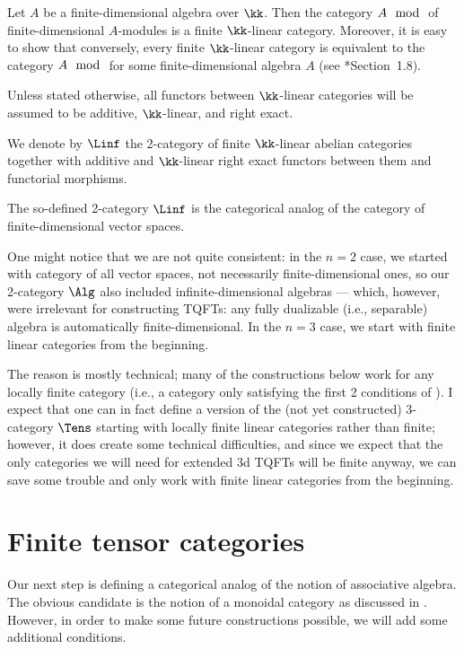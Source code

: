 \begin{example}\label{x:finite-cat-alg}
  Let $A$ be a finite-dimensional algebra over $\kk$. Then the category $A\mod$
  of finite-dimensional $A$-modules is a finite $\kk$-linear category. Moreover,
  it is easy to show that conversely, every finite $\kk$-linear category is
  equivalent to the category $A\mod$ for some finite-dimensional algebra $A$
  (see *{Section~1.8}).
\end{example}


Unless stated otherwise, all functors between $\kk$-linear categories will
be assumed to be additive, $\kk$-linear, and right exact.


\begin{definition}\label{d:linf}
  We denote by $\Linf$ the 2-category of finite $\kk$-linear abelian
  categories together with additive and $\kk$-linear right exact
  functors between them and functorial morphisms.
\end{definition}
The so-defined 2-category $\Linf$ is the categorical analog of the category of
finite-dimensional vector spaces.



\begin{remark}
  One might notice that we are not quite consistent: in the $n=2$ case, we started
  with category of all vector spaces, not necessarily finite-dimensional ones,
  so our 2-category $\Alg$ also included infinite-dimensional algebras ---
  which, however, were irrelevant for constructing TQFTs: any fully dualizable
  (i.e., separable) algebra is automatically finite-dimensional. In the $n=3$ case,
  we start with finite linear categories from the beginning.

  The reason is mostly technical; many of the constructions below work for any
  locally finite category (i.e., a category only satisfying the first 2
  conditions of ). I expect that one can in fact define a
  version of the (not yet constructed) 3-category $\Tens$ starting with
  locally finite linear categories rather than finite; however, it does create
  some technical difficulties, and since we expect that the only categories we
  will need for extended 3d TQFTs will be finite anyway, we can save some
  trouble and only work with finite linear categories from the beginning.
  \end{remark}

\section{Finite tensor categories}\label{s:tensor-categories}
Our next step is defining a categorical analog of the notion of associative
algebra. The obvious candidate is the notion of a monoidal category as
discussed in . However, in order to make some future
constructions possible, we will add some additional conditions.

